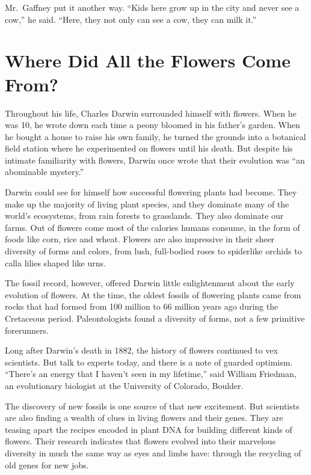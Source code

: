 ﻿\documentclass[12pt]{article}
\begin{document}
Mr.~Gaffney put it another way. ``Kids here grow up in the city and never see a cow,'' he said.
``Here, they not only can see a cow, they can milk it.''

\section{Where Did All the Flowers Come From?}

Throughout his life, Charles Darwin surrounded himself with flowers. When he was 10, he wrote down
each time a peony bloomed in his father's garden. When he bought a house to raise his own family, he
turned the grounds into a botanical field station where he experimented on flowers until his death.
But despite his intimate familiarity with flowers, Darwin once wrote that their evolution was ``an
abominable\cite{abominable} mystery.''

Darwin could see for himself how successful flowering plants had become. They make up the majority
of living plant species, and they dominate many of the world's ecosystems, from rain forests to
grasslands. They also dominate our farms. Out of flowers come most of the calories humans consume,
in the form of foods like corn, rice and wheat. Flowers are also impressive in their sheer diversity
of forms and colors, from lush\cite{lush}, full-bodied roses to spiderlike orchids\cite{orchid} to
calla lilies shaped like urns.

The fossil record, however, offered Darwin little enlightenment about the early evolution of
flowers. At the time, the oldest fossils of flowering plants came from rocks that had formed from
100 million to 66 million years ago during the Cretaceous period.
Paleontologists\cite{paleontologist} found a diversity of forms, not a few primitive forerunners.

Long after Darwin's death in 1882, the history of flowers continued to vex\cite{vex} scientists. But
talk to experts today, and there is a note of guarded optimism. ``There's an energy that I haven't
seen in my lifetime,'' said William Friedman, an evolutionary biologist at the University of
Colorado, Boulder.

The discovery of new fossils is one source of that new excitement. But scientists are also finding a
wealth of clues in living flowers and their genes. They are teasing apart the recipes encoded in
plant DNA for building different kinds of flowers. Their research indicates that flowers evolved
into their marvelous diversity in much the same way as eyes and limbs have: through the recycling of
old genes for new jobs.
\end{document}
